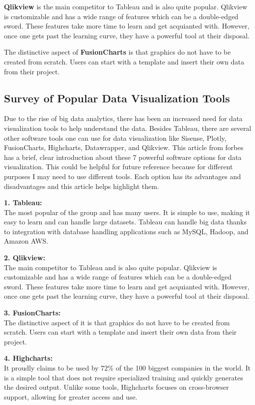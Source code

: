 \documentclass[]{book}
\theoremstyle{definition}
\theoremstyle{definition}
\theoremstyle{definition}
\theoremstyle{remark}
\begin{document}
\textbf{Qlikview} is the main competitor to Tableau and is also quite
popular. Qlikview is customizable and has a wide range of features which
can be a double-edged sword. These features take more time to learn and
get acquianted with. However, once one gets past the learning curve,
they have a powerful tool at their disposal.

The distinctive aspect of \textbf{FusionCharts} is that graphics do not
have to be created from scratch. Users can start with a template and
insert their own data from their project.

\subsection{Survey of Popular Data Visualization
Tools}\label{survey-of-popular-data-visualization-tools}

Due to the rise of big data analytics, there has been an increased need
for data visualization tools to help understand the data. Besides
Tableau, there are several other software tools one can use for data
visualization like Sisense, Plotly, FusionCharts, Highcharts,
Datawrapper, and Qlikview. This article from forbes has a brief, clear
introduction about these 7 powerful software options for data
visualization. This could be helpful for future reference because for
different purposes I may need to use different tools. Each option has
its advantages and disadvantages and this article helps highlight them.

\textbf{1. Tableau:}\\
The most popular of the group and has many users. It is simple to use,
making it easy to learn and can handle large datasets. Tableau can
handle big data thanks to integration with database handling
applications such as MySQL, Hadoop, and Amazon AWS.

\textbf{2. Qlikview:}\\
The main competitor to Tableau and is also quite popular. Qlikview is
customizable and has a wide range of features which can be a
double-edged sword. These features take more time to learn and get
acquianted with. However, once one gets past the learning curve, they
have a powerful tool at their disposal.

\textbf{3. FusionCharts:}\\
The distinctive aspect of it is that graphics do not have to be created
from scratch. Users can start with a template and insert their own data
from their project.

\textbf{4. Highcharts:}\\
It proudly claims to be used by 72\% of the 100 biggest companies in the
world. It is a simple tool that does not require specialized training
and quickly generates the desired output. Unlike some tools, Highcharts
focuses on cross-browser support, allowing for greater access and use.
\end{document}
